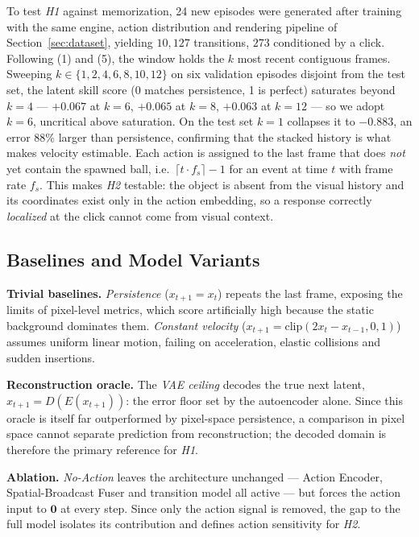 \documentclass[conference]{IEEEtran}
\begin{document}
To test \textit{H1} against memorization, 24 new episodes were generated after training with the same engine, action distribution and rendering pipeline of Section~\ref{sec:dataset}, yielding $10{,}127$ transitions, $273$ conditioned by a click. Following (1) and (5), the window holds the $k$ most recent contiguous frames. Sweeping $k \in \{1,2,4,6,8,10,12\}$ on six validation episodes disjoint from the test set, the latent skill score (0 matches persistence, 1 is perfect) saturates beyond $k=4$ --- $+0.067$ at $k=6$, $+0.065$ at $k=8$, $+0.063$ at $k=12$ --- so we adopt $k=6$, uncritical above saturation. On the test set $k=1$ collapses it to $-0.883$, an error $88\%$ larger than persistence, confirming that the stacked history is what makes velocity estimable. Each action is assigned to the last frame that does \emph{not} yet contain the spawned ball, i.e.\ $\lceil t \cdot f_s \rceil - 1$ for an event at time $t$ with frame rate $f_s$. This makes \textit{H2} testable: the object is absent from the visual history and its coordinates exist only in the action embedding, so a response correctly \emph{localized} at the click cannot come from visual context.

\subsection{Baselines and Model Variants}

\textbf{Trivial baselines.} \emph{Persistence} ($x_{t+1} = x_t$) repeats the last frame, exposing the limits of pixel-level metrics, which score artificially high because the static background dominates them. \emph{Constant velocity} ($x_{t+1} = \text{clip}(2x_t - x_{t-1}, 0, 1)$) assumes uniform linear motion, failing on acceleration, elastic collisions and sudden insertions.

\textbf{Reconstruction oracle.} The \emph{VAE ceiling} decodes the true next latent, $\hat{x}_{t+1} = D(E(x_{t+1}))$: the error floor set by the autoencoder alone. Since this oracle is itself far outperformed by pixel-space persistence, a comparison in pixel space cannot separate prediction from reconstruction; the decoded domain is therefore the primary reference for \textit{H1}.

\textbf{Ablation.} \emph{No-Action} leaves the architecture unchanged --- Action Encoder, Spatial-Broadcast Fuser and transition model all active --- but forces the action input to $\mathbf{0}$ at every step. Since only the action signal is removed, the gap to the full model isolates its contribution and defines action sensitivity for \textit{H2}.
\end{document}
